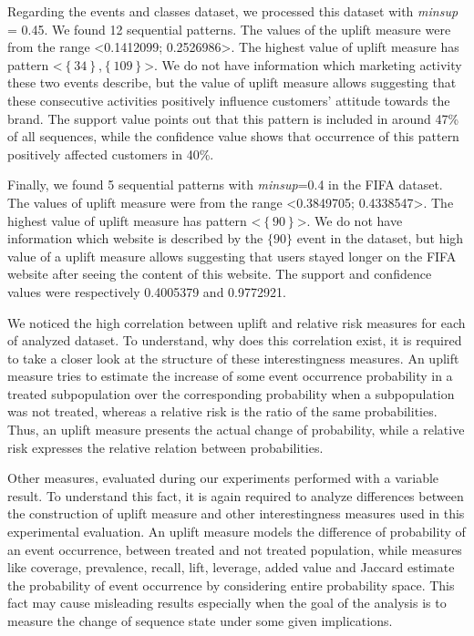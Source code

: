 \documentclass[runningheads,a4paper]{llncs}
\begin{document}
Regarding the events and classes dataset, we processed this dataset with \textit{minsup} = 0.45. We found 12 sequential patterns. The values of the uplift measure were from the range \textless 0.1412099; 0.2526986\textgreater. The highest value of uplift measure has pattern \textless$\left\{\text{34}\right\}$,$\left\{\text{109}\right\}$\textgreater. We do not have information which marketing activity these two events describe, but the value of uplift measure allows suggesting that these consecutive activities positively influence customers’ attitude towards the brand. The support value points out that this pattern is included in around 47\% of all sequences, while the confidence value shows that occurrence of this pattern positively affected customers in 40\%.

Finally, we found 5 sequential patterns with \textit{minsup}=0.4 in the FIFA dataset. The values of uplift measure were from the range \textless 0.3849705; 0.4338547\textgreater. The highest value of uplift measure has pattern \textless$\left\{\text{90}\right\}$\textgreater. We do not have information which website is described by the $\{\text{90}\}$ event in the dataset, but high value of a uplift measure allows suggesting that users stayed longer on the FIFA website after seeing the content of this website. The support and confidence values were respectively 0.4005379 and 0.9772921.

We noticed the high correlation between uplift and relative risk measures for each of analyzed dataset. To understand, why does this correlation exist, it is required to take a closer look at the structure of these interestingness measures. An uplift measure tries to estimate the increase of some event occurrence probability in a treated subpopulation over the corresponding probability when a subpopulation was not treated, whereas a relative risk is the ratio of the same probabilities. Thus, an uplift measure presents the actual change of probability, while a relative risk expresses the relative relation between probabilities.

Other measures, evaluated during our experiments performed with a variable result.
To understand this fact, it is again required to analyze differences between the construction of uplift measure and other interestingness measures used in this experimental evaluation.
An uplift measure models the difference of probability of an event occurrence, between treated and not treated population, while measures like coverage, prevalence, recall, lift, leverage, added value and Jaccard estimate the probability of event occurrence by considering entire probability space.
This fact may cause misleading results especially when the goal of the analysis is to measure the change of sequence state under some given implications.
\end{document}
